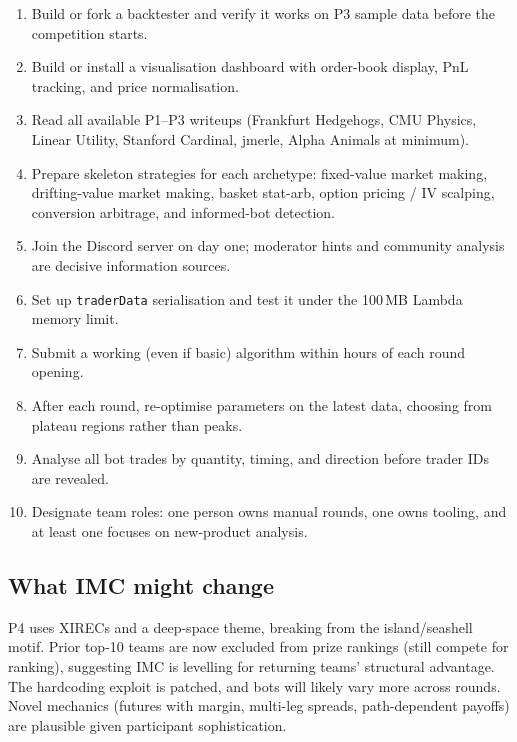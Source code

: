 \begin{keyfactbox}
\begin{enumerate}
  \item Build or fork a backtester and verify it works on P3 sample
        data before the competition starts.
  \item Build or install a visualisation dashboard with order-book
        display, PnL tracking, and price normalisation.
  \item Read all available P1--P3 writeups (Frankfurt Hedgehogs,
        CMU Physics, Linear Utility, Stanford Cardinal, jmerle,
        Alpha Animals at minimum).
  \item Prepare skeleton strategies for each archetype: fixed-value
        market making, drifting-value market making, basket
        stat-arb, option pricing / IV scalping, conversion
        arbitrage, and informed-bot detection.
  \item Join the Discord server on day one; moderator hints and
        community analysis are decisive information sources.
  \item Set up \texttt{traderData} serialisation and test it
        under the 100\,MB Lambda memory limit.
  \item Submit a working (even if basic) algorithm within hours
        of each round opening.
  \item After each round, re-optimise parameters on the latest
        data, choosing from plateau regions rather than peaks.
  \item Analyse all bot trades by quantity, timing, and direction
        before trader IDs are revealed.
  \item Designate team roles: one person owns manual rounds, one
        owns tooling, and at least one focuses on new-product
        analysis.
\end{enumerate}
\end{keyfactbox}

\subsection{What IMC might change}

P4 uses XIRECs and a deep-space theme, breaking from the
island/seashell motif.  Prior top-10 teams are now excluded from
prize rankings (still compete for ranking), suggesting IMC is
levelling for returning teams' structural advantage.  The
hardcoding exploit is patched, and bots will likely vary more
across rounds.  Novel mechanics (futures with margin, multi-leg
spreads, path-dependent payoffs) are plausible given participant
sophistication.

